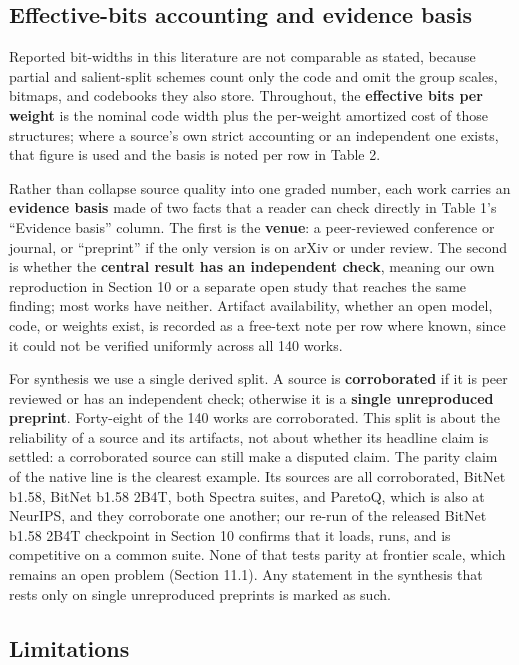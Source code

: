 \documentclass[11pt]{article}
\begin{document}
\subsection{Effective-bits accounting and evidence basis}

Reported bit-widths in this literature are not comparable as stated, because partial and
salient-split schemes count only the code and omit the group scales, bitmaps, and
codebooks they also store. Throughout, the \textbf{effective bits per weight} is the nominal
code width plus the per-weight amortized cost of those structures; where a source's own
strict accounting or an independent one exists, that figure is used and the basis is
noted per row in Table 2.

Rather than collapse source quality into one graded number, each work carries an
\textbf{evidence basis} made of two facts that a reader can check directly in Table 1's
``Evidence basis'' column. The first is the \textbf{venue}: a peer-reviewed conference or journal, or ``preprint''
if the only version is on arXiv or under review. The second is whether the \textbf{central result has an independent check}, meaning our own reproduction in Section 10 or a separate open study that reaches the same finding; most works have neither. Artifact
availability, whether an open model, code, or weights exist, is recorded as a free-text
note per row where known, since it could not be verified uniformly across all 140 works.

For synthesis we use a single derived split. A source is \textbf{corroborated} if it is peer reviewed or has an independent check; otherwise it is a \textbf{single unreproduced preprint}. Forty-eight of the 140 works are corroborated. This split is about the
reliability of a source and its artifacts, not about whether its headline claim is
settled: a corroborated source can still make a disputed claim. The parity claim of the
native line is the clearest example. Its sources are all corroborated, BitNet b1.58,
BitNet b1.58 2B4T, both Spectra suites, and ParetoQ, which is also at NeurIPS, and they
corroborate one another; our re-run of the released BitNet b1.58 2B4T checkpoint in
Section 10 confirms that it loads, runs, and is competitive on a common suite. None of
that tests parity at frontier scale, which remains an open problem (Section 11.1). Any
statement in the synthesis that rests only on single unreproduced preprints is marked as
such.

\subsection{Limitations}
\end{document}
